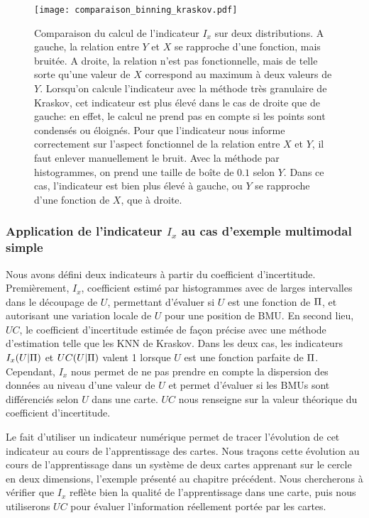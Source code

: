 \documentclass[../main]{subfiles}
\begin{document}
\begin{figure}
    \centering
    \texttt{[image: comparaison\_binning\_kraskov.pdf]}
    \caption{Comparaison du calcul de l'indicateur $I_x$ sur deux distributions. A gauche, la relation entre $Y$ et $X$ se rapproche d'une fonction, mais bruitée. A droite, la relation n'est pas fonctionnelle, mais de telle sorte qu'une valeur de $X$ correspond au maximum à deux valeurs de $Y$. Lorsqu'on calcule l'indicateur avec la méthode très granulaire de Kraskov, cet indicateur est plus élevé dans le cas de droite que de gauche: en effet, le calcul ne prend pas en compte si les points sont condensés ou éloignés. Pour que l'indicateur nous informe correctement sur l'aspect fonctionnel de la relation entre $X$ et $Y$, il faut enlever manuellement le bruit. Avec la méthode par histogrammes, on prend une taille de boîte de $0.1$ selon $Y$. Dans ce cas, l'indicateur est bien plus élevé à gauche, ou $Y$ se rapproche d'une fonction de $X$, que à droite. \label{fig:exemple-limite}}
   
    \end{figure}


\subsubsection{Application de l'indicateur $I_x$ au cas d'exemple multimodal simple}

Nous avons défini deux indicateurs à partir du coefficient d'incertitude. Premièrement, $I_x$, coefficient estimé par histogrammes avec de larges intervalles dans le découpage de $U$, permettant d'évaluer si $U$ est une fonction de $\Pi$, et autorisant une variation locale de $U$ pour une position de BMU.
En second lieu, $UC$, le coefficient d'incertitude estimée de façon précise avec une méthode d'estimation telle que les KNN de Kraskov.
Dans les deux cas, les indicateurs $I_x(U|\Pi)$ et $UC(U|\Pi)$ valent 1 lorsque $U$ est une fonction parfaite de $\Pi$. Cependant, $I_x$ nous permet de ne pas prendre en compte la dispersion des données au niveau d'une valeur de $U$ et permet d'évaluer si les BMUs sont différenciés selon $U$ dans une carte. 
$UC$ nous renseigne sur la valeur théorique du coefficient d'incertitude.

Le fait d'utiliser un indicateur numérique permet de tracer l'évolution de cet indicateur au cours de l'apprentissage des cartes.
Nous traçons cette évolution au cours de l'apprentissage dans un système de deux cartes apprenant sur le cercle en deux dimensions, l'exemple présenté au chapitre précédent.
Nous chercherons à vérifier que $I_x$ reflète bien la qualité de l'apprentissage dans une carte, puis nous utiliserons $UC$ pour évaluer l'information réellement portée par les cartes.
\end{document}
